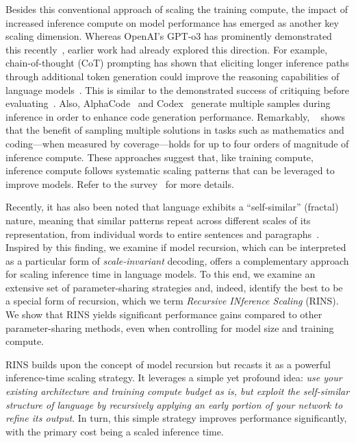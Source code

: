 Besides this conventional approach of scaling the training compute, the impact of increased inference compute on model performance has emerged as another key scaling dimension. Whereas OpenAI's GPT-o3 has prominently demonstrated this recently~\citep{openai_o_series}, earlier work had already explored this direction. For example, chain-of-thought (CoT) prompting has shown that eliciting longer inference paths through additional token generation could improve the reasoning capabilities of language models~\citep{cot_paper}. This is similar to the demonstrated success of critiquing before evaluating~\cite{ankner2024critiqueoutloudrewardmodels}. Also, AlphaCode~\citep{alphacode_paper} and Codex~\cite{chen2021evaluatinglargelanguagemodels} generate multiple samples during inference in order to enhance code generation performance. Remarkably, ~\citet{brown2024largelanguagemonkeysscaling} shows that the benefit of sampling multiple solutions in tasks such as mathematics and coding---when measured by coverage---holds for up to four orders of magnitude of inference compute. These approaches suggest that, like training compute, inference compute follows systematic scaling patterns that can be leveraged to improve models. Refer to the survey~\cite{welleck2024from} for more details.  

Recently, it has also been noted that language exhibits a ``self-similar'' (fractal) nature, meaning that similar patterns repeat across different scales of its representation, from individual words to entire sentences and paragraphs~\citep{alabdulmohsin2024fractalpatternsilluminatesuccess}. Inspired by this finding, we examine if {model recursion}, which can be interpreted as a particular form of \emph{scale-invariant} decoding, offers a complementary approach for scaling inference time in language models.  To this end, we examine an extensive set of parameter-sharing strategies and, indeed, identify the best to be a special form of recursion, which we term \emph{Recursive INference Scaling} (RINS). We show that RINS yields significant performance gains compared to other parameter-sharing methods, even when controlling for model size and training compute.

RINS builds upon the concept of model recursion but recasts it as a powerful inference-time scaling strategy. It leverages a simple yet profound idea: \emph{use your existing architecture and training compute budget as is, but exploit the self-similar structure of language by recursively applying an early portion of your network to refine its output}. In turn, this simple strategy improves performance significantly, with the primary cost being a scaled inference time.

